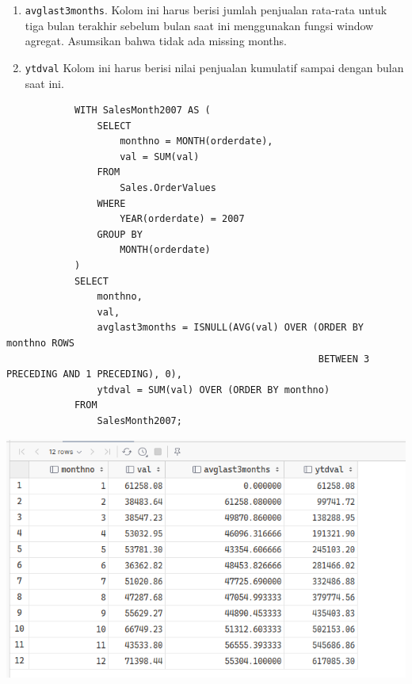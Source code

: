 \documentclass[12pt,titlepage]{article}
\begin{document}
\begin{enumerate}
{        \begin{enumerate}
            \item \texttt{avglast3months}. Kolom ini harus berisi jumlah penjualan rata-rata untuk tiga bulan
            terakhir sebelum bulan saat ini menggunakan fungsi window agregat. Asumsikan bahwa tidak ada missing months.
            \item \texttt{ytdval} Kolom ini harus berisi nilai penjualan kumulatif sampai dengan bulan saat ini.
        \end{enumerate}

        \begin{verbatim}
            WITH SalesMonth2007 AS (
                SELECT
                    monthno = MONTH(orderdate),
                    val = SUM(val)
                FROM
                    Sales.OrderValues
                WHERE
                    YEAR(orderdate) = 2007
                GROUP BY
                    MONTH(orderdate)
            )
            SELECT
                monthno,
                val,
                avglast3months = ISNULL(AVG(val) OVER (ORDER BY monthno ROWS 
                                                       BETWEEN 3 PRECEDING AND 1 PRECEDING), 0),
                ytdval = SUM(val) OVER (ORDER BY monthno)
            FROM
                SalesMonth2007;
        \end{verbatim}

        \begin{center}
            \includegraphics[width=.8\textwidth]{./images/14.png}
        \end{center}
    }
\end{enumerate}
\end{document}
